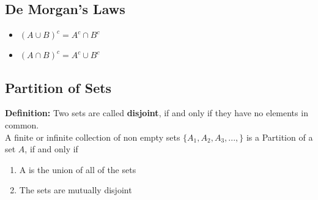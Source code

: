 \documentclass{report}
\begin{document}
    \bigbreak \noindent \bigbreak \noindent 
    \subsection{De Morgan's Laws}
    \bigbreak \noindent 
    \begin{itemize}
        \item $(A \cup B)^{c} = A^{c} \cap B^{c}$
        \item $(A \cap B)^{c} = A^{c} \cup B^{c}$
    \end{itemize}

    \bigbreak \noindent \bigbreak \noindent 
    \subsection{Partition of Sets}
    \bigbreak \noindent 
    \begin{mdframed}
        \textbf{Definition:}
        Two sets are called \textbf{disjoint}, if and only if they have no elements in common. \\
        A finite or infinite collection of non empty sets $\{A_{1}, A_{2}, A_{3}, ..., \} $ is a Partition of a set $A $, if and only if 
        \begin{enumerate}
            \item A is the union of all of the sets
            \item The sets are mutually disjoint
        \end{enumerate}
    \end{mdframed}
    \bigbreak \noindent 





    



    
\end{document}
